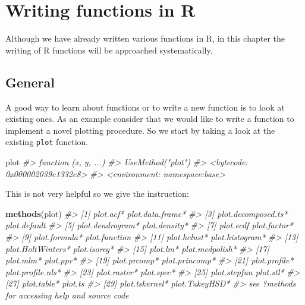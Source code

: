 \documentclass[
]{book}
\newenvironment{Shaded}{\begin{snugshade}}{\end{snugshade}}
\newcommand{\CommentTok}[1]{\textcolor[rgb]{0.56,0.35,0.01}{\textit{#1}}}
\newcommand{\FunctionTok}[1]{\textcolor[rgb]{0.13,0.29,0.53}{\textbf{#1}}}
\newcommand{\NormalTok}[1]{#1}
\begin{document}
\chapter{Writing functions in R}\label{functions}

Although we have already written various functions in R, in this chapter the writing of R functions will be approached systematically.

\section{General}\label{general-2}

A good way to learn about functions or to write a new function is to look at existing ones. As an example consider that we would like to write a function to implement a novel plotting procedure. So we start by taking a look at the existing \texttt{plot} function.

\begin{Shaded}
\begin{Highlighting}[]
\NormalTok{plot}
\CommentTok{\#\textgreater{} function (x, y, ...) }
\CommentTok{\#\textgreater{} UseMethod("plot")}
\CommentTok{\#\textgreater{} \textless{}bytecode: 0x000002039c1332c8\textgreater{}}
\CommentTok{\#\textgreater{} \textless{}environment: namespace:base\textgreater{}}
\end{Highlighting}
\end{Shaded}

This is not very helpful so we give the instruction:

\begin{Shaded}
\begin{Highlighting}[]
\FunctionTok{methods}\NormalTok{(plot)}
\CommentTok{\#\textgreater{}  [1] plot.acf*           plot.data.frame*   }
\CommentTok{\#\textgreater{}  [3] plot.decomposed.ts* plot.default       }
\CommentTok{\#\textgreater{}  [5] plot.dendrogram*    plot.density*      }
\CommentTok{\#\textgreater{}  [7] plot.ecdf           plot.factor*       }
\CommentTok{\#\textgreater{}  [9] plot.formula*       plot.function      }
\CommentTok{\#\textgreater{} [11] plot.hclust*        plot.histogram*    }
\CommentTok{\#\textgreater{} [13] plot.HoltWinters*   plot.isoreg*       }
\CommentTok{\#\textgreater{} [15] plot.lm*            plot.medpolish*    }
\CommentTok{\#\textgreater{} [17] plot.mlm*           plot.ppr*          }
\CommentTok{\#\textgreater{} [19] plot.prcomp*        plot.princomp*     }
\CommentTok{\#\textgreater{} [21] plot.profile*       plot.profile.nls*  }
\CommentTok{\#\textgreater{} [23] plot.raster*        plot.spec*         }
\CommentTok{\#\textgreater{} [25] plot.stepfun        plot.stl*          }
\CommentTok{\#\textgreater{} [27] plot.table*         plot.ts            }
\CommentTok{\#\textgreater{} [29] plot.tskernel*      plot.TukeyHSD*     }
\CommentTok{\#\textgreater{} see \textquotesingle{}?methods\textquotesingle{} for accessing help and source code}
\end{Highlighting}
\end{Shaded}
\end{document}
